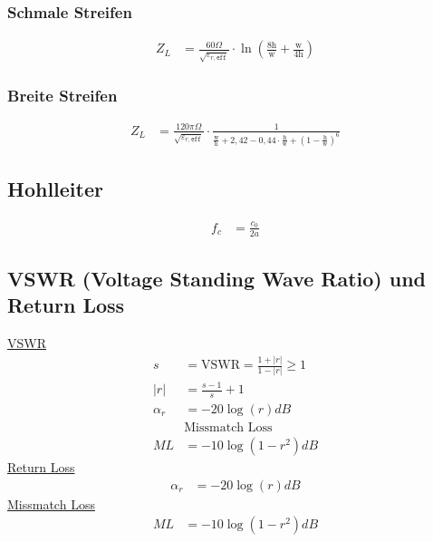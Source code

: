 \subsubsection{Schmale Streifen}
\begin{align*}
    Z_L & = \frac{60\Omega}{\sqrt{\varepsilon_{r,\texttt{eff}}}}\cdot\ln\left(\frac{8\text{h}}{\text{w}}+\frac{\mathrm{w}}{4\mathrm{h}}\right)
\end{align*}
\subsubsection{Breite Streifen}
\begin{align*}
    Z_L & = \frac{120\pi\Omega}{\sqrt{\varepsilon_{r,\texttt{eff}}}}\cdot\frac{1}{\frac{\text{w}}{\text{h}}+2,42-0,44\cdot\frac{\mathrm{h}}{\mathrm{w}}+\left(1-\frac{\mathrm{h}}{\mathrm{w}}\right)^6}
\end{align*}

\subsection{Hohlleiter}
\begin{align*}
    f_c & = \frac{c_0}{2a}
\end{align*}

\subsection{VSWR (Voltage Standing Wave Ratio) und Return Loss}
\underline{VSWR}
\begin{align*}
    s        & = \mathrm{VSWR} = \frac{1+|r|}{1-|r|}\geq 1 \\
    |r|      & = \frac{s-1}s+{1}                           \\
    \alpha_r & = -20\log(r)dB                              \\
             & \text{Missmatch Loss}                       \\
    ML       & = -10\log(1-r^2)dB
\end{align*}
\underline{Return Loss}
\begin{align*}
    \alpha_r & = -20\log(r)dB
\end{align*}
\underline{Missmatch Loss}
\begin{align*}
    ML & = -10\log(1-r^2)dB
\end{align*}